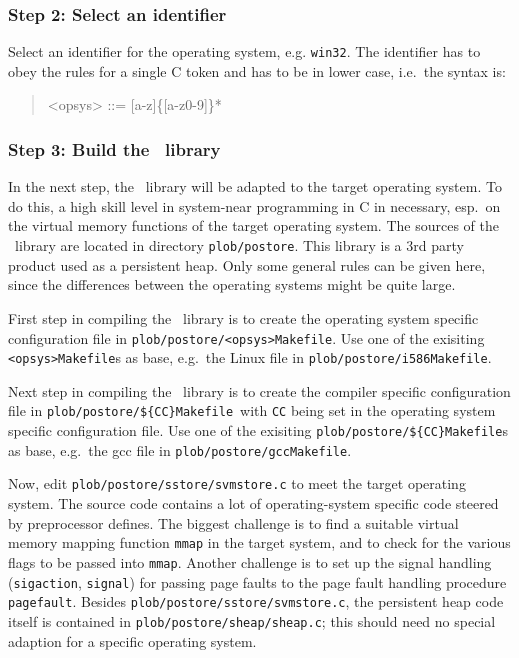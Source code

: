 \subsubsection{Step 2: Select an identifier}

Select an identifier for the operating system, e.g. \texttt{win32}.
The identifier has to obey the rules for a single C token and has to
be in lower case, i.e.\ the syntax is:
\begin{quotation}
<opsys> ::= [a-z]\{[a-z0-9]\}*
\end{quotation}

\subsubsection{Step 3: Build the \protect\postore\ library}

In the next step, the \postore\ library will be adapted to the target
operating system. To do this, a high skill level in system-near
programming in C in necessary, esp.\ on the virtual memory functions of
the target operating system.  The sources of the \postore\ library are
located in directory \texttt{plob/postore}. This library is a 3rd
party product used as a persistent heap. Only some general rules can
be given here, since the differences between the operating systems
might be quite large.

First step in compiling the \postore\ library is to create the
operating system specific configuration file in
\texttt{plob/postore/<opsys>\us{}Makefile}. Use one of the exisiting
\texttt{<opsys>\us{}Makefile}s as base, e.g.\ the Linux file in
\texttt{plob/postore/i586\us{}Makefile}.

Next step in compiling the \postore\ library is to create the
compiler specific configuration file in
\texttt{plob/postore/\$\{CC\}\us{}Makefile}\ with \texttt{CC} being
set in the operating system specific configuration file. Use one of
the exisiting \texttt{plob/postore/\$\{CC\}\us{}Makefile}s as base,
e.g.\ the gcc file in \texttt{plob/postore/gcc\us{}Makefile}.

Now, edit \texttt{plob/postore/sstore/svmstore.c} to meet the target
operating system. The source code contains a lot of operating-system
specific code steered by preprocessor defines. The biggest challenge
is to find a suitable virtual memory mapping function \texttt{mmap} in
the target system, and to check for the various flags to be passed
into \texttt{mmap}. Another challenge is to set up the signal handling
(\texttt{sigaction}, \texttt{signal}) for passing page faults to the
page fault handling procedure \texttt{page\us{}fault}. Besides
\texttt{plob/postore/sstore/svmstore.c}, the persistent heap code
itself is contained in \texttt{plob/postore/sheap/sheap.c}; this
should need no special adaption for a specific operating system.

